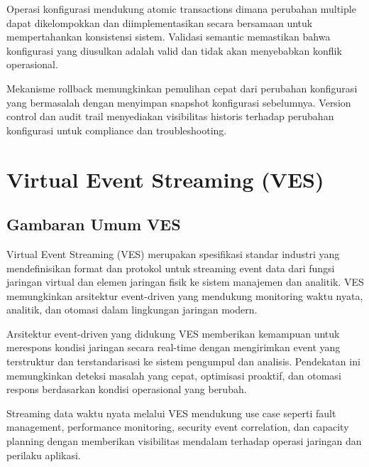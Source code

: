 Operasi konfigurasi mendukung atomic transactions dimana perubahan multiple dapat dikelompokkan dan diimplementasikan secara bersamaan untuk mempertahankan konsistensi sistem. Validasi semantic memastikan bahwa konfigurasi yang diusulkan adalah valid dan tidak akan menyebabkan konflik operasional.

Mekanisme rollback memungkinkan pemulihan cepat dari perubahan konfigurasi yang bermasalah dengan menyimpan snapshot konfigurasi sebelumnya. Version control dan audit trail menyediakan visibilitas historis terhadap perubahan konfigurasi untuk compliance dan troubleshooting.

\section{Virtual Event Streaming (VES)}

\subsection{Gambaran Umum VES}

Virtual Event Streaming (VES) merupakan spesifikasi standar industri yang mendefinisikan format dan protokol untuk streaming event data dari fungsi jaringan virtual dan elemen jaringan fisik ke sistem manajemen dan analitik. VES memungkinkan arsitektur event-driven yang mendukung monitoring waktu nyata, analitik, dan otomasi dalam lingkungan jaringan modern.

Arsitektur event-driven yang didukung VES memberikan kemampuan untuk merespons kondisi jaringan secara real-time dengan mengirimkan event yang terstruktur dan terstandarisasi ke sistem pengumpul dan analisis. Pendekatan ini memungkinkan deteksi masalah yang cepat, optimisasi proaktif, dan otomasi respons berdasarkan kondisi operasional yang berubah.

Streaming data waktu nyata melalui VES mendukung use case seperti fault management, performance monitoring, security event correlation, dan capacity planning dengan memberikan visibilitas mendalam terhadap operasi jaringan dan perilaku aplikasi.


